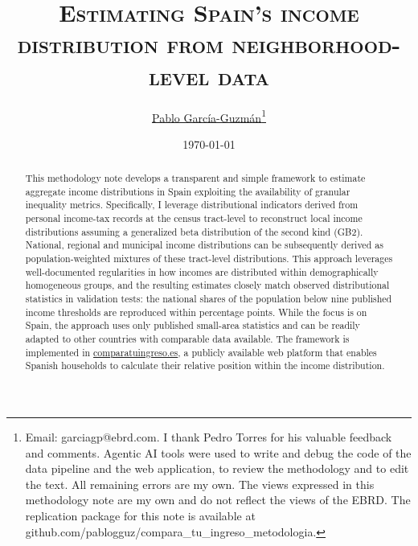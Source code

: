 \documentclass[letterpaper,11pt,leqno]{article}
\begin{document}
\title{\Large \textsc{Estimating Spain's income distribution from neighborhood-level data}}

\author{\href{https://pablogguz.github.io/}{\large{Pablo García-Guzmán}\thanks{Email: \href{mailto:garciagp@ebrd.com}{garciagp@ebrd.com}. I thank Pedro Torres for his valuable feedback and comments. Agentic AI tools were used to write and debug the code of the data pipeline and the web application, to review the methodology and to edit the text. All remaining errors are my own. The views expressed in this methodology note are my own and do not reflect the views of the EBRD. The replication package for this note is available at \href{https://github.com/pablogguz/compara_tu_ingreso_metodologia}{github.com/pablogguz/compara\_tu\_ingreso\_metodologia}.}} \\ \normalsize{}}

\date{\normalsize \today \\}

\maketitle
\begin{abstract}
\onehalfspacing
This methodology note develops a transparent and simple framework to estimate aggregate income distributions in Spain exploiting the availability of granular inequality metrics. Specifically, I leverage distributional indicators derived from personal income-tax records at the census tract-level to reconstruct local income distributions assuming a generalized beta distribution of the second kind (GB2). National, regional and municipal income distributions can be subsequently derived as population-weighted mixtures of these tract-level distributions. This approach leverages well-documented regularities in how incomes are distributed within demographically homogeneous groups, and the resulting estimates closely match observed distributional statistics in validation tests: the national shares of the population below nine published income thresholds are reproduced within \ThrAllMaxDiff{} percentage points. While the focus is on Spain, the approach uses only published small-area statistics and can be readily adapted to other countries with comparable data available. The framework is implemented in \href{https://comparatuingreso.es/}{\mbox{comparatuingreso.es}}, a publicly available web platform that enables Spanish households to calculate their relative position within the income distribution.
\end{abstract}
\end{document}

